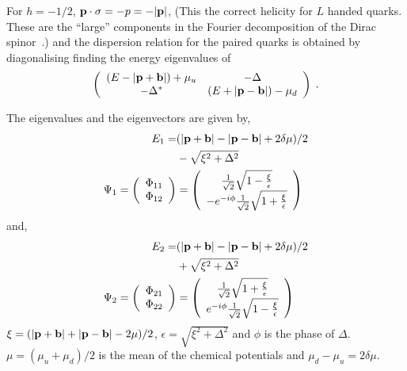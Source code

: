 \documentclass[10pt, aps, prd, superscriptaddress, nofootinbib, 
               amsmath, amssymb, twocolumn,
               preprintnumbers, showpacs,
               raggedbottom,
               floatfix]{revtex4-1}
\newcommand{\bfp}{{\bf{p}}}
\newcommand{\bfb}{{\bf{b}}}
\begin{document}
For $h=-1/2$, $\bfp\cdot\sigma=-p=-|{\bf{p}}|$, (This the correct helicity for $L$ handed
quarks. These are the ``large'' components in the Fourier decomposition of
the Dirac spinor~\cite{Mannarelli:2006}.) and the dispersion relation for the paired
quarks is obtained by diagonalising finding the energy eigenvalues of 
\begin{equation}
   \left(\begin{array}{cc}
   (E-|\bfp+\bfb|) + \mu_u  &-\Delta \\
  -\Delta^{*} & (E+|\bfp-\bfb|) - \mu_d
  \end{array}
  \right)\;.
\end{equation}

The eigenvalues and the eigenvectors are given by,
\begin{equation}
\begin{split}
E_1 =& (|\bfp+\bfb|-|\bfp-\bfb|+2\delta\mu)/2 \\
&- \sqrt{\xi^2+\Delta^2}\\
\Psi_1 = \left(\begin{array}{c}\Phi_{11}\\\Phi_{12}\end{array}
\right)
&=\left(\begin{array}{c}
 \frac{1}{\sqrt{2}}\sqrt{1-\frac{\xi}{\epsilon}}\\
 -e^{-i\phi}\frac{1}{\sqrt{2}}\sqrt{1+\frac{\xi}{\epsilon}}
 \end{array}
 \right)~\label{eq:E1Psi1}
\end{split}
\end{equation}
and,
\begin{equation}
\begin{split}
E_2 =& (|\bfp+\bfb|-|\bfp-\bfb|+2\delta\mu)/2 \\
&+ \sqrt{\xi^2+\Delta^2}\\
\Psi_2 = \left(\begin{array}{c}\Phi_{21}\\\Phi_{22}\end{array}
\right)
&=\left(\begin{array}{c}
 \frac{1}{\sqrt{2}}\sqrt{1+\frac{\xi}{\epsilon}}\\
 e^{-i\phi}\frac{1}{\sqrt{2}}\sqrt{1-\frac{\xi}{\epsilon}}
 \end{array}
 \right)~\label{eq:E2Psi2}
\end{split}
\end{equation}
$\xi=(|\bfp+\bfb|+|\bfp-\bfb|-2{\mu})/2$, $\epsilon=\sqrt{\xi^2+\Delta^2}$ and
$\phi$ is the phase of $\Delta$. $\mu=(\mu_u+\mu_d)/2$ is the mean of the
chemical potentials and $\mu_d-\mu_u=2\delta\mu$. 
\end{document}
